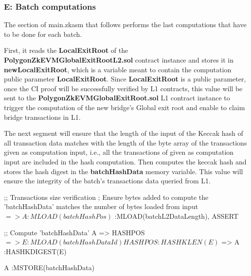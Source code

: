 \subsubsection{E: Batch computations}

The section of main.zkasm that follows performs the last computations that have to be done for each batch.

First, it reads the \textbf{LocalExitRoot} of the \textbf{PolygonZkEVMGlobalExitRootL2.sol} contract instance and stores it in \textbf{newLocalExitRoot}, which is a variable meant to contain the computation public parameter \textbf{LocalExitRoot}. Since  \textbf{LocalExitRoot} is a public parameter, once the CI proof will be successfully verified by L1 contracts, this value will be sent to the \textbf{PolygonZkEVMGlobalExitRoot.sol} L1 contract instance to trigger the computation of the new bridge's Global exit root and enable to claim bridge transactions in L1.


The next segment will ensure that the length of the input of the Keccak hash of all transaction data matches with the length of the byte array of the transactions given as computation input, i.e., all the transactions of given as computation input are included in the hash computation. Then computes the keccak hash and stores the hash digest in the \textbf{batchHashData} memory variable. This value will ensure the integrity of the batch's transactions data queried from L1.
 
\begin{zkasm}
;; Transactions size verification
; Ensure bytes added to compute the 'batchHashData' matches the number of bytes loaded from input
$ => A                          :MLOAD(batchHashPos)
$                               :MLOAD(batchL2DataLength), ASSERT

;; Compute 'batchHashData'
A => HASHPOS
$ => E                          :MLOAD(batchHashDataId)

HASHPOS                         :HASHKLEN(E)
$ => A                          :HASHKDIGEST(E)

A                               :MSTORE(batchHashData)
\end{zkasm}

